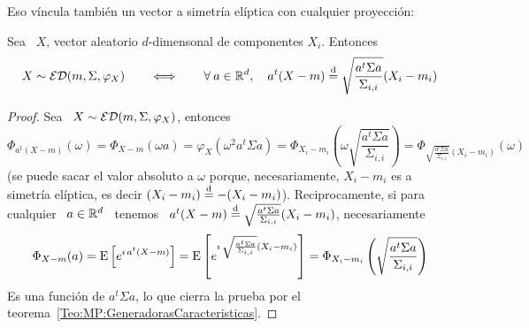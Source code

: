 Eso  v\'incula  tambi\'en  un  vector  a  simetr\'ia  el\'iptica  con  cualquier
proyecci\'on:
%
\begin{teorema}
\label{Teo:MP:ProyeccionComponentesEliptica}
%
  Sea \ $X$, vector aleatorio $d$-dimensonal de componentes $X_i$. Entonces
  \[
  X \sim \mathcal{ED}(m,\Sigma,\varphi_X) \qquad  \Longleftrightarrow \qquad \forall \: a
  \in \mathbb{R}^d, \quad a^t (X - m) \stackrel{\mathrm{d}}{=} \sqrt{\frac{a^t \Sigma a}{\Sigma_{i,i}}}
  (X_i - m_i)
  \]
\end{teorema}
%
\begin{proof}
  Sea \ $X \sim \mathcal{ED}(m,\Sigma,\varphi_X)$, entonces
  \[
  \Phi_{a^t (X - m)}(\omega) = \Phi_{X - m}(\omega a) = \varphi_X\left( \omega^2
    a^t \Sigma  a \right)  = \Phi_{X_i-m_i}\left( \omega  \sqrt{\frac{a^t \Sigma
        a}{\Sigma_{i,i}}}\right)       =       \Phi_{\sqrt{\frac{a^t      \Sigma
        a}{\Sigma_{i,i}}} (X_i-m_i)}\left( \omega \right)
  \]
  (se puede sacar el valor absoluto a $\omega$ porque, necesariamente, $X_i-m_i$
  es     a    simetr\'ia    el\'iptica,     es    decir     $(X_i-m_i)    \stackrel{\mathrm{d}}{=}
  -(X_i-m_i)$). Reciprocamente, si para cualquier  \ $a \in \mathbb{R}^d$ \ tenemos \
  $a^t (X  - m)  \stackrel{\mathrm{d}}{=} \sqrt{\frac{a^t \Sigma  a}{\Sigma_{i,i}}} (X_i  - m_i)$,
  necesariamente
  \[
  \Phi_{X  - m}(a) =  \operatorname{E}\left[ e^{\imath  \, a^t  (X-m)} \right]  = \operatorname{E}\left[
    e^{\imath \, \sqrt{\frac{a^t \Sigma a}{\Sigma_{i,i}}} (X_i - m_i)} \right] =
  \Phi_{X_i-m_i}\left( \sqrt{\frac{a^t \Sigma a}{\Sigma_{i,i}}}\right)
  \]
  Es  una  funci\'on  de  $a^t  \Sigma  a$,  lo que  cierra  la  prueba  por  el
  teorema~\ref{Teo:MP:GeneradorasCaracteristicas}.
\end{proof}


